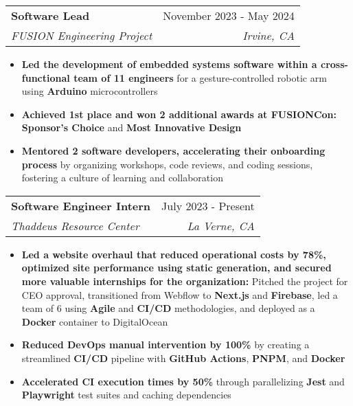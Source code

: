 \documentclass[letterpaper,11pt]{article}
\makeatletter
\newcommand{\resumeItem}[1]{
  \item\setstretch{.95}\small{
    {#1 \vspace{-2pt}}
  }
}
\newcommand{\resumeSubheading}[4]{
  \vspace{-2pt}\item
    \begin{tabular*}{0.97\textwidth}[t]{l@{\extracolsep{\fill}}r}
      \textbf{#1} & #2 \\
      \textit{\small#3} & \textit{\small #4} \\
    \end{tabular*}\vspace{-4.8pt}
}
\newcommand{\resumeItemListStart}{\begin{itemize}}
\newcommand{\resumeItemListEnd}{\end{itemize}\vspace{-5pt}}
\makeatother
\begin{document}
  \resumeSubheading
  {Software Lead}{November 2023 - May 2024}
  {FUSION Engineering Project}{Irvine, CA}
  \resumeItemListStart
    \resumeItem{\textbf{Led the development of embedded systems software within a cross-functional team of 11 engineers} for a gesture-controlled robotic arm using \textbf{Arduino} microcontrollers}
    \resumeItem{\textbf{Achieved 1st place and won 2 additional awards at FUSIONCon:} \textbf{Sponsor's Choice} and \textbf{Most Innovative Design}}
    \resumeItem{\textbf{Mentored 2 software developers, accelerating their onboarding process} by organizing workshops, code reviews, and coding sessions, fostering a culture of learning and collaboration}
  \resumeItemListEnd
  
  \resumeSubheading
    {Software Engineer Intern}{July 2023 - Present}
    {Thaddeus Resource Center}{La Verne, CA}
    \resumeItemListStart
      \resumeItem{\textbf{Led a website overhaul that reduced operational costs by 78\%, optimized site performance using static generation, and secured more valuable internships for the organization:} Pitched the project for CEO approval, transitioned from Webflow to \textbf{Next.js} and \textbf{Firebase}, led a team of 6 using \textbf{Agile} and \textbf{CI/CD} methodologies, and deployed as a \textbf{Docker} container to DigitalOcean}
      \resumeItem{\textbf{Reduced DevOps manual intervention by 100\%} by creating a streamlined \textbf{CI/CD} pipeline with \textbf{GitHub Actions}, \textbf{PNPM}, and \textbf{Docker}}
      \resumeItem{\textbf{Accelerated CI execution times by 50\%} through parallelizing \textbf{Jest} and \textbf{Playwright} test suites and caching dependencies}
    \resumeItemListEnd
\end{document}
